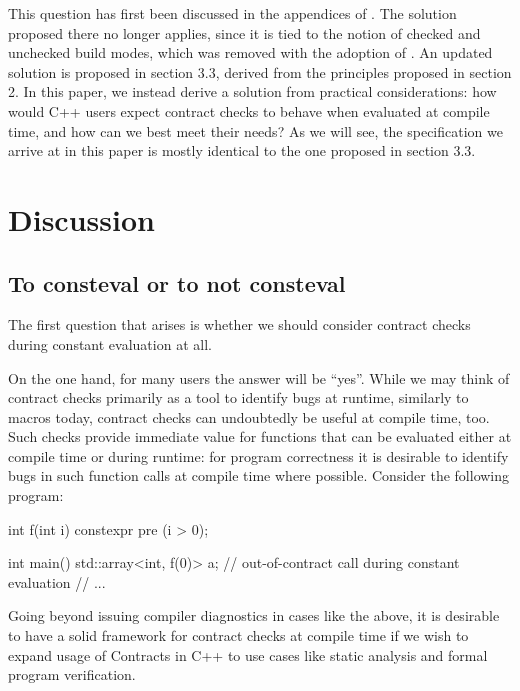 This question has first been discussed in the appendices of \cite{P2834R1}. The solution proposed there no longer applies, since it is tied to the notion of checked and unchecked build modes, which was removed with the adoption of \cite{P2877R0}. An updated solution is proposed in \cite{P2932R1} section 3.3, derived from the  principles proposed in \cite{P2932R1} section 2. In this paper, we instead derive a solution from practical considerations: how would C++ users expect contract checks to behave when evaluated at compile time, and how can we best meet their needs? As we will see, the specification we arrive at in this paper is mostly identical to the one proposed in \cite{P2932R1} section 3.3.


\section{Discussion}

\subsection{To consteval or to not consteval}

The first question that arises is whether we should consider contract checks during constant evaluation at all.

On the one hand, for many users the answer will be ``yes''. While we may think of contract checks primarily as a tool to identify bugs at runtime, similarly to  macros today, contract checks can undoubtedly be useful at compile time, too. Such checks provide immediate value for  functions that can be evaluated either at compile time or during runtime: for program correctness it is desirable to identify bugs in such function calls at compile time where possible. Consider the following program:

\begin{codeblock}
int f(int i) constexpr 
  pre (i > 0);

int main() {
  std::array<int, f(0)> a;  // out-of-contract call during constant evaluation
  // ...
}
\end{codeblock}

Going beyond issuing compiler diagnostics in cases like the above, it is desirable to have a solid framework for contract checks at compile time if we wish to expand usage of Contracts in C++ to use cases like static analysis and formal program verification. 

